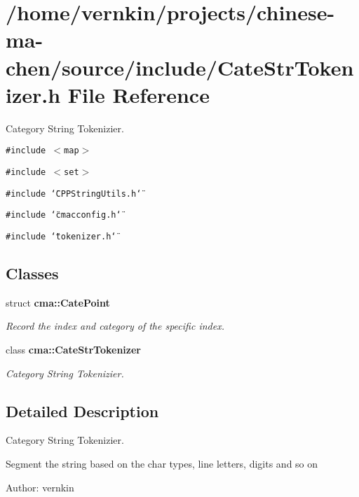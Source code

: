 \section{/home/vernkin/projects/chinese-ma-chen/source/include/CateStrTokenizer.h File Reference}
\label{CateStrTokenizer_8h}
Category String Tokenizier.  


{\tt \#include $<$map$>$}\par
{\tt \#include $<$set$>$}\par
{\tt \#include \char`\"{}CPPStringUtils.h\char`\"{}}\par
{\tt \#include \char`\"{}cmacconfig.h\char`\"{}}\par
{\tt \#include \char`\"{}tokenizer.h\char`\"{}}\par
\subsection*{Classes}
\begin{CompactItemize}
\item 
struct {\bf cma::CatePoint}
\begin{CompactList}\small\item\em Record the index and category of the specific index. \item\end{CompactList}\item 
class {\bf cma::CateStrTokenizer}
\begin{CompactList}\small\item\em Category String Tokenizier. \item\end{CompactList}\end{CompactItemize}


\subsection{Detailed Description}
Category String Tokenizier. 

Segment the string based on the char types, line letters, digits and so on

\begin{Desc}
\item[Author:]vernkin \end{Desc}
